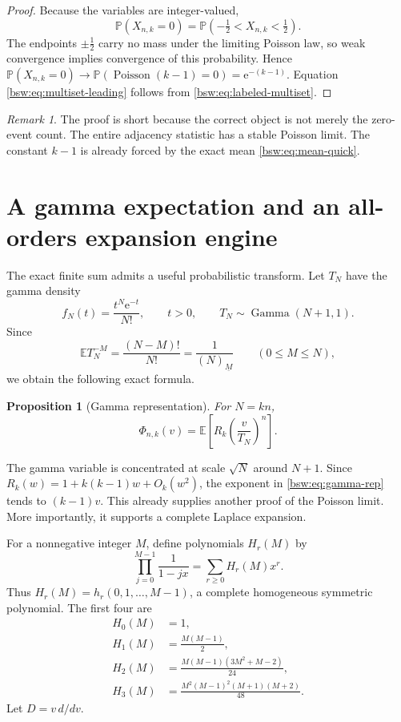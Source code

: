 \documentclass[11pt,letterpaper]{article}
\newtheorem{proposition}[theorem]{Proposition}
\theoremstyle{definition}
\theoremstyle{remark}
\newtheorem{remark}[theorem]{Remark}
\newcommand{\EE}{\mathbb E}
\newcommand{\PP}{\mathbb P}
\newcommand{\ee}{\mathrm e}
\newcommand{\fall}[2]{(#1)_{\underline{#2}}}
\newcommand{\Pois}{\operatorname{Poisson}}
\DeclareMathOperator{\GammaDist}{Gamma}
\begin{document}
\begin{proof}
Because the variables are integer-valued,
\[
 \PP(X_{n,k}=0)=\PP(-\tfrac12<X_{n,k}<\tfrac12).
\]
The endpoints $\pm\tfrac12$ carry no mass under the limiting Poisson law, so
weak convergence implies convergence of this probability.  Hence
$\PP(X_{n,k}=0)\to\PP(\Pois(k-1)=0)=\ee^{-(k-1)}$.
Equation \eqref{bsw:eq:multiset-leading} follows from
\eqref{bsw:eq:labeled-multiset}.
\end{proof}

\begin{remark}
The proof is short because the correct object is not merely the zero-event
count.  The entire adjacency statistic has a stable Poisson limit.  The
constant $k-1$ is already forced by the exact mean \eqref{bsw:eq:mean-quick}.
\end{remark}

\section{A gamma expectation and an all-orders expansion engine}

The exact finite sum admits a useful probabilistic transform.  Let
$T_N$ have the gamma density
\begin{equation}\label{bsw:eq:gamma-density}
 f_N(t)=\frac{t^N\ee^{-t}}{N!},\qquad t>0,
 \qquad T_N\sim\GammaDist(N+1,1).
\end{equation}
Since
\begin{equation}\label{bsw:eq:negative-moment}
 \EE T_N^{-M}=\frac{(N-M)!}{N!}=\frac1{\fall NM}
 \qquad(0\le M\le N),
\end{equation}
we obtain the following exact formula.

\begin{proposition}[Gamma representation]\label{bsw:prop:gamma}
For $N=kn$,
\begin{equation}\label{bsw:eq:gamma-rep}
 \boxed{\displaystyle
 \Phi_{n,k}(v)=\EE\left[R_k\!\left(\frac v{T_N}\right)^n\right].}
\end{equation}
\end{proposition}

The gamma variable is concentrated at scale $\sqrt N$ around $N+1$.  Since
$R_k(w)=1+k(k-1)w+O_k(w^2)$, the exponent in
\eqref{bsw:eq:gamma-rep} tends to $(k-1)v$.  This already supplies another proof
of the Poisson limit.  More importantly, it supports a complete Laplace
expansion.

For a nonnegative integer $M$, define polynomials $H_r(M)$ by
\begin{equation}\label{bsw:eq:Hr-def}
 \prod_{j=0}^{M-1}\frac1{1-jx}=\sum_{r\ge0}H_r(M)x^r.
\end{equation}
Thus $H_r(M)=h_r(0,1,\ldots,M-1)$, a complete homogeneous symmetric
polynomial.  The first four are
\begin{align}
 H_0(M)&=1,\label{bsw:eq:H0}\\
 H_1(M)&=\frac{M(M-1)}2,\label{bsw:eq:H1}\\
 H_2(M)&=\frac{M(M-1)(3M^2+M-2)}{24},\label{bsw:eq:H2}\\
 H_3(M)&=\frac{M^2(M-1)^2(M+1)(M+2)}{48}.
 \label{bsw:eq:H3}
\end{align}
Let $D=v\,d/dv$.
\end{document}

